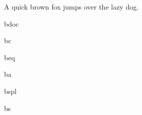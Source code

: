 \documentclass{article}
\begin{document}
A quick brown fox jumps over the lazy dog.

bdoc

bc

beq

ba

bspl

bs
\end{document}
